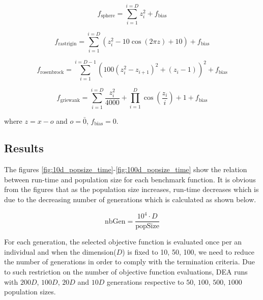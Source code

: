 \documentclass[conference]{IEEEtran}
\begin{document}
\begin{equation*}
	f_\text{sphere} = \sum_{i=1}^{i=D} z_i^2 + f_\text{bias}
	\label{func:sphere}
\end{equation*}

\begin{equation*}
	f_\text{rastrigin} = \sum_{i=1}^{i=D} (z_i^2 - 10\cos(2\pi z) + 10) + f_\text{bias}
	\label{func:rastrigin}
\end{equation*}

\begin{equation*}
	f_\text{rosenbrock} = \sum_{i=1}^{i=D-1} (100(z_i^2 - z_{i+1})^2 + (z_i - 1))^2 + f_\text{bias}
	\label{func:rosenbrock}
\end{equation*}

\begin{equation*}
	f_\text{griewank} = \sum_{i=1}^{i=D} \frac{z_i^2}{4000} + \prod_{i=1}^{D} \cos(\frac{z_i}{i}) + 1 + f_\text{bias} 
	\label{func:griewank}
\end{equation*}

where $z = x - o$ and $o = \bar{0}$, $f_\text{bias} = 0$.

\subsection{Results}
The figures \ref{fig:10d_popsize_time}-\ref{fig:100d_popsize_time} show the relation between run-time and population size for each benchmark function. It is obvious from the figures that as the population 
size increases, run-time decreases which is due to the decreasing number of generations which is calculated as shown below.

\begin{equation}
	\text{nbGen} = \frac{10^4 \cdot D}{\text{popSize}}
	\label{eq:nbgen}
\end{equation}

For each generation, the selected objective function is evaluated once per an individual and when the dimension($D$) is fixed to 10, 50, 100, we need to reduce the number of generations in order to comply 
with the termination criteria. Due to such restriction on the number of objective function evaluations, DEA runs with $200D$, $100D$, $20D$ and $10D$ generations respective to $50$, $100$, $500$, $1000$ 
population sizes.
\end{document}
